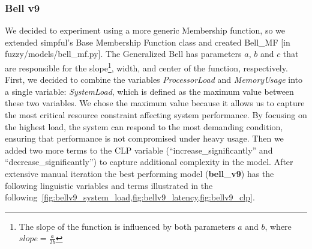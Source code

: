 \documentclass[titlepage]{article}
\begin{document}
\subsubsection{Bell v9}
\label{sec:bell_v9}
We decided to experiment using a more generic Membership function, so we
extended simpful's Base Membership Function class and created Bell\_MF [in fuzzy/models/bell\_mf.py].
The Generalized Bell has parameters $a$, $b$ and $c$ that are responsible for the slope\footnote[1]{The slope of the function is influenced by both parameters $a$ and $b$, where $slope = \frac{a}{2b}$}, width, and center of the function, respectively.
\newline
\newline
First, we decided to combine the variables \textit{ProcessorLoad} and \textit{MemoryUsage} into a single variable: \textit{SystemLoad}, which is defined as the maximum value between these two variables. We chose the maximum value because it allows us to capture the most critical resource constraint affecting system performance. By focusing on the highest load, the system can respond to the most demanding condition, ensuring that performance is not compromised under heavy usage. Then we added two more terms to the CLP variable (``increase\_significantly'' and ``decrease\_significantly'') to capture additional complexity in the model.
\newline
After extensive manual iteration the best performing model (\textbf{bell\_v9}) has the following linguistic variables and terms illustrated in the following~\cref{fig:bellv9_system_load,fig:bellv9_latency,fig:bellv9_clp}.
\end{document}
